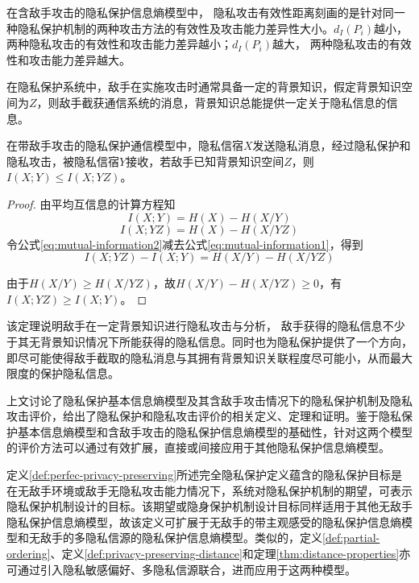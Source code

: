 在含敌手攻击的隐私保护信息熵模型中， 隐私攻击有效性距离刻画的是针对同一种隐私保护机制的两种攻击方法的有效性及攻击能力差异性大小。$d_{I}(P_{i})$越小，两种隐私攻击的有效性和攻击能力差异越小；$d_{I}(P_{i})$越大， 两种隐私攻击的有效性和攻击能力差异越大。

在隐私保护系统中，敌手在实施攻击时通常具备一定的背景知识，假定背景知识空间为$Z$，则敌手截获通信系统的消息，背景知识总能提供一定关于隐私信息的信息。

\begin{theorem}
	\label{thm:privacy-attack-performance}
	在带敌手攻击的隐私保护通信模型中，隐私信宿$X$发送隐私消息，经过隐私保护和隐私攻击，被隐私信宿$Y$接收，若敌手已知背景知识空间$Z$，则$I(X;Y)\leqslant I(X;YZ)$。
\end{theorem} 

\begin{proof}
由平均互信息的计算方程知
\begin{equation}
\label{eq:mutual-information1}
I(X;Y) =H(X)-H(X/Y)
\end{equation}
\begin{equation}
\label{eq:mutual-information2}
I(X;YZ) =H(X)-H(X/YZ)
\end{equation}
令公式\ref{eq:mutual-information2}减去公式\ref{eq:mutual-information1}，得到
\begin{equation}
I(X;YZ)-I(X;Y) =H(X/Y)-H(X/YZ)
\end{equation}

由于$H(X/Y) \geqslant H(X/YZ)$，故$H(X/Y)- H(X/YZ)\geqslant0$，有$I(X;YZ)\geqslant I(X;Y)$。
\end{proof}

该定理说明敌手在一定背景知识进行隐私攻击与分析， 敌手获得的隐私信息不少于其无背景知识情况下所能获得的隐私信息。同时也为隐私保护提供了一个方向，即尽可能使得敌手截取的隐私消息与其拥有背景知识关联程度尽可能小，从而最大限度的保护隐私信息。


上文讨论了隐私保护基本信息熵模型及其含敌手攻击情况下的隐私保护机制及隐私攻击评价，给出了隐私保护和隐私攻击评价的相关定义、定理和证明。鉴于隐私保护基本信息熵模型和含敌手攻击的隐私保护信息熵模型的基础性，针对这两个模型的评价方法可以通过有效扩展，直接或间接应用于其他隐私保护信息熵模型。

定义\ref{def:perfec-privacy-preserving}所述完全隐私保护定义蕴含的隐私保护目标是在无敌手环境或敌手无隐私攻击能力情况下，系统对隐私保护机制的期望，可表示隐私保护机制设计的目标。该期望或隐身保护机制设计目标同样适用于其他无敌手隐私保护信息熵模型，故该定义可扩展于无敌手的带主观感受的隐私保护信息熵模型和无敌手的多隐私信源的隐私保护信息熵模型。类似的，定义\ref{def:partial-ordering}、定义\ref{def:privacy-preserving-distance}和定理\ref{thm:distance-properties}亦可通过引入隐私敏感偏好、多隐私信源联合，进而应用于这两种模型。

